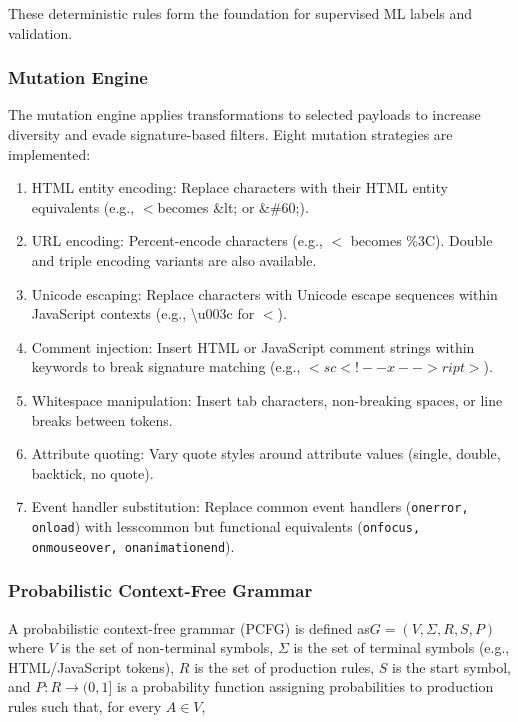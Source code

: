 These deterministic rules form the foundation for supervised ML labels and validation.

\subsubsection{Mutation Engine}

The mutation engine applies transformations to selected payloads to increase diversity and evade signature-based filters. Eight mutation strategies are implemented:


\begin{enumerate}
    \item HTML entity encoding: Replace characters with their HTML entity equivalents (e.g., $<$becomes \&lt; or \&\#60;).

    \item URL encoding: Percent-encode characters (e.g., $<$ becomes \%3C). Double and triple encoding variants are also available.
    \item Unicode escaping: Replace characters with Unicode escape sequences within JavaScript contexts (e.g., \textbackslash u003c for $<$).
    \item Comment injection: Insert HTML or JavaScript comment strings within keywords to break signature matching (e.g., $<sc<!--x-->ript>$).
    \item Whitespace manipulation: Insert tab characters, non-breaking spaces, or line breaks between tokens.
    \item Attribute quoting: Vary quote styles around attribute values (single, double, backtick, no quote).
    \item Event handler substitution: Replace common event handlers (\texttt{onerror, onload}) with lesscommon but functional equivalents (\texttt{onfocus, onmouseover, onanimationend}).

\end{enumerate}
\subsubsection{Probabilistic Context-Free Grammar}
A probabilistic context-free grammar (PCFG) is defined as$
G = (V, \Sigma, R, S, P)$
where \(V\) is the set of non-terminal symbols, \(\Sigma\) is the set of terminal symbols
(e.g., HTML/JavaScript tokens), \(R\) is the set of production rules, \(S\) is the start symbol,
and $ P : R \rightarrow (0,1]$ is a probability function assigning probabilities to production rules such that, for every \(A \in V\),

